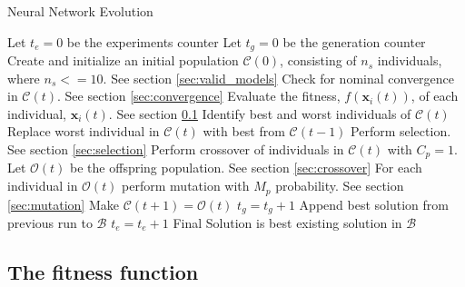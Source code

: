 \documentclass[journal]{IEEEtran}
\begin{document}
\begin{algorithm}[!htb]
\caption{Neural Network Evolution}
\begin{algorithmic}
\State Let $t_e = 0$ be the experiments counter
	\State Let $t_g = 0$ be the generation counter
	\State Create and initialize an initial population $\mathcal{C}(0)$, consisting of $n_s$ individuals, where $n_s <= 10$. See section \ref{sec:valid_models}
		\State Check for nominal convergence in $\mathcal{C}(t)$. See section \ref{sec:convergence}
		\State Evaluate the fitness, $f(\mathbf{x}_i(t))$, of each individual, $\mathbf{x}_i(t)$. See section \ref{sec:fitness_function}
		\State Identify best and worst individuals of $\mathcal{C}(t)$
		\State Replace worst individual in $\mathcal{C}(t)$ with best from $\mathcal{C}(t-1)$
		\State Perform selection. See section \ref{sec:selection}
		\State Perform crossover of individuals in $\mathcal{C}(t)$ with $C_p=1$. Let $\mathcal{O}(t)$ be the offspring population. See section \ref{sec:crossover}
		\State For each individual in $\mathcal{O}(t)$ perform mutation with $M_p$ probability. See section \ref{sec:mutation}
		\State Make $\mathcal{C}(t+1) = \mathcal{O}(t)$ 
	    \State $t_g = t_g + 1$
	\EndWhile
	 \State Append best solution from previous run to $\mathcal{B}$
	 \State $t_e = t_e + 1$
\EndWhile
\State Final Solution is best existing solution in $\mathcal{B}$
\end{algorithmic}
\label{algorithm:nn_ea}
\end{algorithm}

\subsection{The fitness function}
\label{sec:fitness_function}
\end{document}
